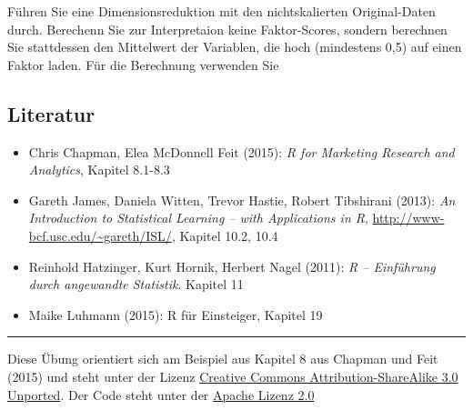 \documentclass[12pt,]{book}
\newenvironment{Shaded}{\begin{snugshade}}{\end{snugshade}}
\newcommand{\KeywordTok}[1]{\textcolor[rgb]{0.13,0.29,0.53}{\textbf{{#1}}}}
\newcommand{\DataTypeTok}[1]{\textcolor[rgb]{0.13,0.29,0.53}{{#1}}}
\newcommand{\DecValTok}[1]{\textcolor[rgb]{0.00,0.00,0.81}{{#1}}}
\newcommand{\StringTok}[1]{\textcolor[rgb]{0.31,0.60,0.02}{{#1}}}
\newcommand{\OtherTok}[1]{\textcolor[rgb]{0.56,0.35,0.01}{{#1}}}
\newcommand{\NormalTok}[1]{{#1}}
\providecommand{\tightlist}{%
  \setlength{\itemsep}{0pt}\setlength{\parskip}{0pt}}
\begin{document}
Führen Sie eine Dimensionsreduktion mit den nichtskalierten
Original-Daten durch. Berechenn Sie zur Interpretaion keine
Faktor-Scores, sondern berechnen Sie stattdessen den Mittelwert der
Variablen, die hoch (mindestens 0,5) auf einen Faktor laden. Für die
Berechnung verwenden Sie

\begin{Shaded}
\end{Shaded}

\subsection{Literatur}\label{literatur-4}

\begin{itemize}
\tightlist
\item
  Chris Chapman, Elea McDonnell Feit (2015): \emph{R for Marketing
  Research and Analytics}, Kapitel 8.1-8.3
\item
  Gareth James, Daniela Witten, Trevor Hastie, Robert Tibshirani (2013):
  \emph{An Introduction to Statistical Learning -- with Applications in
  R}, \url{http://www-bcf.usc.edu/~gareth/ISL/}, Kapitel 10.2, 10.4
\item
  Reinhold Hatzinger, Kurt Hornik, Herbert Nagel (2011): \emph{R --
  Einführung durch angewandte Statistik}. Kapitel 11
\item
  Maike Luhmann (2015): R für Einsteiger, Kapitel 19
\end{itemize}

\begin{center}\rule{0.5\linewidth}{\linethickness}\end{center}

Diese Übung orientiert sich am Beispiel aus Kapitel 8 aus Chapman und
Feit (2015) und steht unter der Lizenz
\href{http://creativecommons.org/licenses/by-sa/3.0}{Creative Commons
Attribution-ShareAlike 3.0 Unported}. Der Code steht unter der
\href{http://www.apache.org/licenses/LICENSE-2.0}{Apache Lizenz 2.0}
\end{document}
